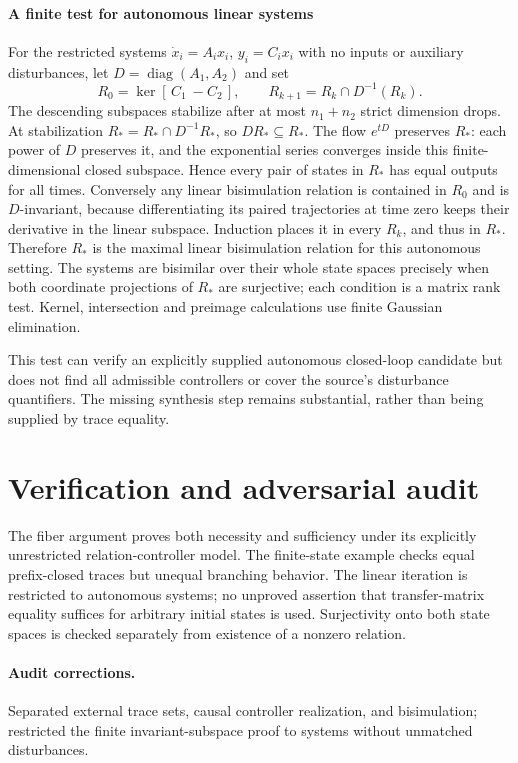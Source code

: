 \documentclass[11pt]{article}
\begin{document}
\paragraph{A finite test for autonomous linear systems}
For the restricted systems $\dot x_i=A_ix_i$, $y_i=C_ix_i$ with no inputs or auxiliary disturbances, let $D=\operatorname{diag}(A_1,A_2)$ and set
\[
 R_0=\ker[\,C_1\ -C_2\,],\qquad
 R_{k+1}=R_k\cap D^{-1}(R_k).
\]
The descending subspaces stabilize after at most $n_1+n_2$ strict dimension drops. At stabilization $R_*=R_*\cap D^{-1}R_*$, so $DR_*\subseteq R_*$. The flow $e^{tD}$ preserves $R_*$: each power of $D$ preserves it, and the exponential series converges inside this finite-dimensional closed subspace. Hence every pair of states in $R_*$ has equal outputs for all times. Conversely any linear bisimulation relation is contained in $R_0$ and is $D$-invariant, because differentiating its paired trajectories at time zero keeps their derivative in the linear subspace. Induction places it in every $R_k$, and thus in $R_*$. Therefore $R_*$ is the maximal linear bisimulation relation for this autonomous setting. The systems are bisimilar over their whole state spaces precisely when both coordinate projections of $R_*$ are surjective; each condition is a matrix rank test. Kernel, intersection and preimage calculations use finite Gaussian elimination.

This test can verify an explicitly supplied autonomous closed-loop candidate but does not find all admissible controllers or cover the source's disturbance quantifiers. The missing synthesis step remains substantial, rather than being supplied by trace equality.

\section{Verification and adversarial audit}
The fiber argument proves both necessity and sufficiency under its explicitly unrestricted relation-controller model. The finite-state example checks equal prefix-closed traces but unequal branching behavior. The linear iteration is restricted to autonomous systems; no unproved assertion that transfer-matrix equality suffices for arbitrary initial states is used. Surjectivity onto both state spaces is checked separately from existence of a nonzero relation.
\paragraph{Audit corrections.} Separated external trace sets, causal controller realization, and bisimulation; restricted the finite invariant-subspace proof to systems without unmatched disturbances.
\end{document}
